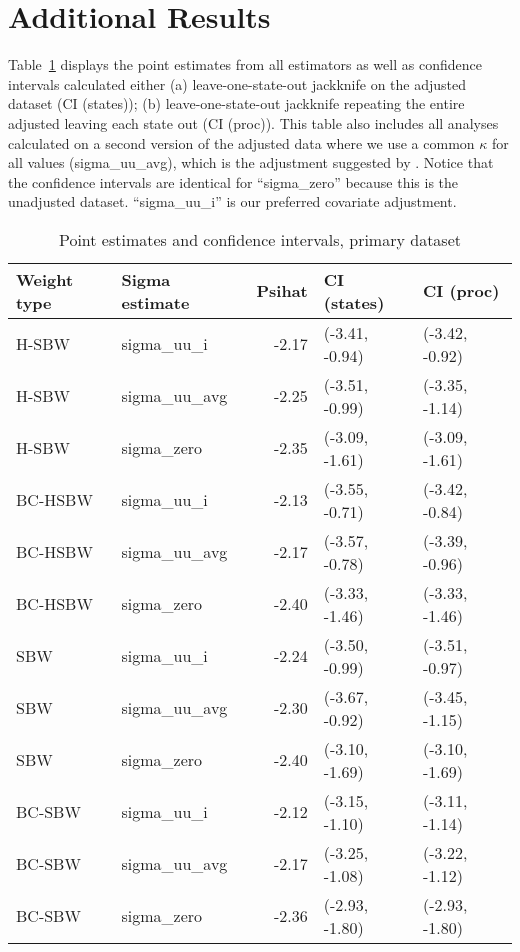 \section{Additional Results}
\label{ssec:allresults}

Table~\ref{tab:confintmain} displays the point estimates from all estimators as well as confidence intervals calculated either (a) leave-one-state-out jackknife on the adjusted dataset (CI (states)); (b) leave-one-state-out jackknife repeating the entire adjusted leaving each state out (CI (proc)). This table also includes all analyses calculated on a second version of the adjusted data where we use a common $\kappa$ for all values (sigma\_uu\_avg), which is the adjustment suggested by \cite{carroll2006measurement}. Notice that the confidence intervals are identical for ``sigma\_zero'' because this is the unadjusted dataset. ``sigma\_uu\_i'' is our preferred covariate adjustment.

\begin{table}[ht]
\centering
\caption{Point estimates and confidence intervals, primary dataset}
\label{tab:confintmain}
\begin{tabular}{llrll}
  \hline
Weight type & Sigma estimate & Psihat & CI (states) & CI (proc) \\ 
  \hline
H-SBW & sigma\_uu\_i & -2.17 & (-3.41, -0.94) & (-3.42, -0.92) \\ 
  H-SBW & sigma\_uu\_avg & -2.25 & (-3.51, -0.99) & (-3.35, -1.14) \\ 
  H-SBW & sigma\_zero & -2.35 & (-3.09, -1.61) & (-3.09, -1.61) \\ 
  BC-HSBW & sigma\_uu\_i & -2.13 & (-3.55, -0.71) & (-3.42, -0.84) \\ 
  BC-HSBW & sigma\_uu\_avg & -2.17 & (-3.57, -0.78) & (-3.39, -0.96) \\ 
  BC-HSBW & sigma\_zero & -2.40 & (-3.33, -1.46) & (-3.33, -1.46) \\ 
  SBW & sigma\_uu\_i & -2.24 & (-3.50, -0.99) & (-3.51, -0.97) \\ 
  SBW & sigma\_uu\_avg & -2.30 & (-3.67, -0.92) & (-3.45, -1.15) \\ 
  SBW & sigma\_zero & -2.40 & (-3.10, -1.69) & (-3.10, -1.69) \\ 
  BC-SBW & sigma\_uu\_i & -2.12 & (-3.15, -1.10) & (-3.11, -1.14) \\ 
  BC-SBW & sigma\_uu\_avg & -2.17 & (-3.25, -1.08) & (-3.22, -1.12) \\ 
  BC-SBW & sigma\_zero & -2.36 & (-2.93, -1.80) & (-2.93, -1.80) \\ 
   \hline
\end{tabular}
\end{table}

